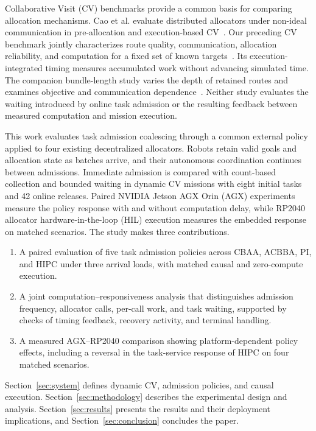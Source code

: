 \documentclass[conference]{IEEEtran}
\begin{document}
Collaborative Visit (CV) benchmarks provide a common basis for comparing allocation mechanisms. Cao et al. evaluate distributed allocators under non-ideal communication in pre-allocation and execution-based CV~\cite{cao2025cv}. Our preceding CV benchmark jointly characterizes route quality, communication, allocation reliability, and computation for a fixed set of known targets~\cite{lott2026benchmark}. Its execution-integrated timing measures accumulated work without advancing simulated time. The companion bundle-length study varies the depth of retained routes and examines objective and communication dependence~\cite{lott2026bundle}. Neither study evaluates the waiting introduced by online task admission or the resulting feedback between measured computation and mission execution.

This work evaluates task admission coalescing through a common external policy applied to four existing decentralized allocators. Robots retain valid goals and allocation state as batches arrive, and their autonomous coordination continues between admissions. Immediate admission is compared with count-based collection and bounded waiting in dynamic CV missions with eight initial tasks and 42 online releases. Paired NVIDIA Jetson AGX Orin (AGX) experiments measure the policy response with and without computation delay, while RP2040 allocator hardware-in-the-loop (HIL) execution measures the embedded response on matched scenarios. The study makes three contributions.
\begin{enumerate}
\item A paired evaluation of five task admission policies across CBAA, ACBBA, PI, and HIPC under three arrival loads, with matched causal and zero-compute execution.
\item A joint computation--responsiveness analysis that distinguishes admission frequency, allocator calls, per-call work, and task waiting, supported by checks of timing feedback, recovery activity, and terminal handling.
\item A measured AGX--RP2040 comparison showing platform-dependent policy effects, including a reversal in the task-service response of HIPC on four matched scenarios.
\end{enumerate}

Section~\ref{sec:system} defines dynamic CV, admission policies, and causal execution. Section~\ref{sec:methodology} describes the experimental design and analysis. Section~\ref{sec:results} presents the results and their deployment implications, and Section~\ref{sec:conclusion} concludes the paper.
\end{document}
